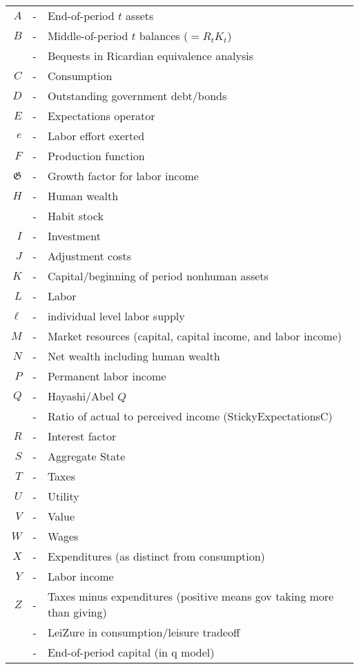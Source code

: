 \documentclass{article}
\begin{document}
\begin{table}
\begin{tabular}{rcl}
    $A$ & - & End-of-period $t$ assets
\\  $B$ & - & Middle-of-period $t$ balances ($=R_{t} K_{t}$)
\\      & - & Bequests in Ricardian equivalence analysis
\\  $C$ & - & Consumption
\\  $D$ & - & Outstanding government debt/bonds
\\  $E$ & - & Expectations operator
\\  $e$ & - & Labor effort exerted
\\  $F$ & - & Production function
\\  $\mathfrak{G}$ & - & Growth factor for labor income
\\  $H$ & - & Human wealth
\\      & - & Habit stock
\\  $I$ & - & Investment
\\  $J$ & - & Adjustment costs
\\  $K$ & - & Capital/beginning of period nonhuman assets
\\  $L$ & - & Labor
\\  $\ell$ & - & individual level labor supply
\\  $M$ & - & Market resources (capital, capital income, and labor income)
\\  $N$ & - & Net wealth including human wealth
\\  $P$ & - & Permanent labor income
\\  $Q$ & - & Hayashi/Abel $Q$
\\      & - & Ratio of actual to perceived income (StickyExpectationsC)
\\  $R$ & - & Interest factor
\\  $S$ & - & Aggregate State
\\  $T$ & - & Taxes
\\  $U$ & - & Utility
\\  $V$ & - & Value
\\  $W$ & - & Wages
\\  $X$ & - & Expenditures (as distinct from consumption)
\\  $Y$ & - & Labor income
\\  $Z$ & - & Taxes minus expenditures (positive means gov taking more than giving)
\\      & - & LeiZure in consumption/leisure tradeoff
\\      & - & End-of-period capital (in q model)

\end{tabular}
\end{table}
\end{document}
